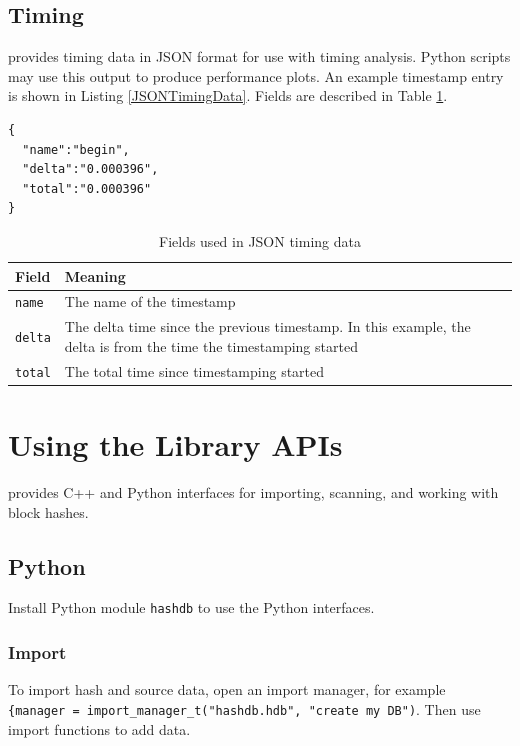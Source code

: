 \documentclass[11pt,fleqn]{article} %
\begin{document}
\subsection{Timing}
\hdb provides timing data in JSON format for use with timing analysis. Python scripts may use this output to produce performance plots. An example timestamp entry is shown in Listing \ref{JSONTimingData}. Fields are described in Table \ref{tab:JSONTimingData}.\\

\lstset{style=customfile}
\begin{lstlisting}[caption={Example JSON timestamp format}, label=JSONTimingData]
{
  "name":"begin",
  "delta":"0.000396",
  "total":"0.000396"
}
\end{lstlisting}

\begin{table}[!ht]

\centering
\caption{Fields used in JSON timing data}
\label{tab:JSONTimingData}
\begin{tabular}{|p{5 cm}|p{8.8 cm}|}
\hline \hline
\textbf{Field} & \textbf{Meaning} \\
\hline
\verb+name+ & The name of the timestamp\\
\hline
\verb+delta+ & The delta time since the previous timestamp. In this example, the delta is from the time the timestamping started\\
\hline
\verb+total+ & The total time since timestamping started\\
\hline
\end{tabular}
\end{table}



\section{Using the \hdb Library APIs}
\label{APIs}
\hdb provides C++ and Python interfaces for importing, scanning, and working with block hashes.

\subsection{Python}
Install Python module \verb+hashdb+ to use the \hdb Python interfaces.

\subsubsection{Import}
To import hash and source data, open an import manager, for example\\
\verb+{manager = import_manager_t("hashdb.hdb", "create my DB")+. Then use import functions to add data.
\end{document}
